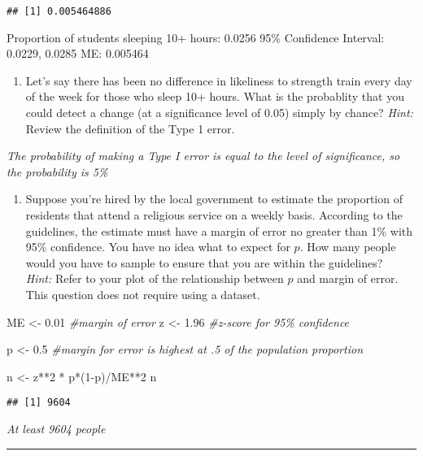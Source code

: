 \documentclass[
]{article}
\newenvironment{Shaded}{\begin{snugshade}}{\end{snugshade}}
\newcommand{\CommentTok}[1]{\textcolor[rgb]{0.56,0.35,0.01}{\textit{#1}}}
\newcommand{\DecValTok}[1]{\textcolor[rgb]{0.00,0.00,0.81}{#1}}
\newcommand{\FloatTok}[1]{\textcolor[rgb]{0.00,0.00,0.81}{#1}}
\newcommand{\NormalTok}[1]{#1}
\newcommand{\OtherTok}[1]{\textcolor[rgb]{0.56,0.35,0.01}{#1}}
\newcommand{\SpecialCharTok}[1]{\textcolor[rgb]{0.00,0.00,0.00}{#1}}
\providecommand{\tightlist}{%
  \setlength{\itemsep}{0pt}\setlength{\parskip}{0pt}}
\begin{document}
\begin{verbatim}
## [1] 0.005464886
\end{verbatim}

Proportion of students sleeping 10+ hours: 0.0256 95\% Confidence
Interval: 0.0229, 0.0285 ME: 0.005464

\begin{enumerate}
\def\labelenumi{\arabic{enumi}.}
\setcounter{enumi}{9}
\tightlist
\item
  Let's say there has been no difference in likeliness to strength train
  every day of the week for those who sleep 10+ hours. What is the
  probablity that you could detect a change (at a significance level of
  0.05) simply by chance? \emph{Hint:} Review the definition of the Type
  1 error.
\end{enumerate}

\emph{The probability of making a Type I error is equal to the level of
significance, so the probability is 5\%}

\begin{enumerate}
\def\labelenumi{\arabic{enumi}.}
\setcounter{enumi}{10}
\tightlist
\item
  Suppose you're hired by the local government to estimate the
  proportion of residents that attend a religious service on a weekly
  basis. According to the guidelines, the estimate must have a margin of
  error no greater than 1\% with 95\% confidence. You have no idea what
  to expect for \(p\). How many people would you have to sample to
  ensure that you are within the guidelines?\\
  \emph{Hint:} Refer to your plot of the relationship between \(p\) and
  margin of error. This question does not require using a dataset.
\end{enumerate}

\begin{Shaded}
\begin{Highlighting}[]
\NormalTok{ME }\OtherTok{\textless{}{-}} \FloatTok{0.01} \CommentTok{\#margin of error}
\NormalTok{z }\OtherTok{\textless{}{-}} \FloatTok{1.96} \CommentTok{\#z{-}score for 95\% confidence}

\NormalTok{p }\OtherTok{\textless{}{-}} \FloatTok{0.5} \CommentTok{\#margin for error is highest at .5 of the population proportion}

\NormalTok{n }\OtherTok{\textless{}{-}}\NormalTok{ z}\SpecialCharTok{**}\DecValTok{2} \SpecialCharTok{*}\NormalTok{ p}\SpecialCharTok{*}\NormalTok{(}\DecValTok{1}\SpecialCharTok{{-}}\NormalTok{p)}\SpecialCharTok{/}\NormalTok{ME}\SpecialCharTok{**}\DecValTok{2}
\NormalTok{n}
\end{Highlighting}
\end{Shaded}

\begin{verbatim}
## [1] 9604
\end{verbatim}

\emph{At least 9604 people}

\begin{center}\rule{0.5\linewidth}{0.5pt}\end{center}
\end{document}
